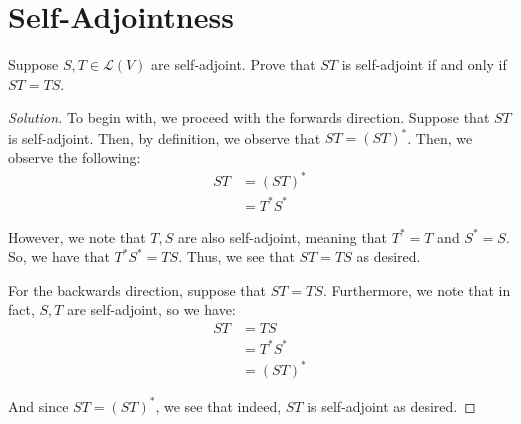 \documentclass{article}
\newenvironment{solution}{\begin{proof}[Solution]}{\end{proof}}
\begin{document}
\section{Self-Adjointness}
\begin{hw}
	Suppose $S,T \in \mathcal{L}(V)$ are self-adjoint. Prove that $ST$ is self-adjoint if and only if $ST = TS$.
\end{hw}
\begin{solution}
	To begin with, we proceed with the forwards direction. Suppose that $ST$ is self-adjoint. Then, by definition, we observe that $ST = (ST)^{*}$. Then, we observe the following:
	\begin{align*}
		ST &= (ST)^{*} \\
		&= T^{*}S^{*}
	\end{align*}

	However, we note that $T,S$ are also self-adjoint, meaning that $T^{*} = T$ and $S^{*} = S$. So, we have that $T^{*}S^{*} = TS$. Thus, we see that $ST = TS$ as desired.
	
	For the backwards direction, suppose that $ST = TS$. Furthermore, we note that in fact, $S, T$ are self-adjoint, so we have:
	\begin{align*}
		ST &= TS \\
		&= T^{*}S^{*} \\
		&= (ST)^{*}
	\end{align*}

	And since $ST = (ST)^{*}$, we see that indeed, $ST$ is self-adjoint as desired.
\end{solution}

\newpage
\end{document}
